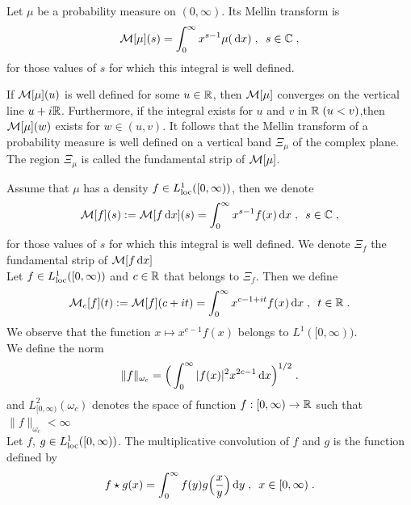 Let $\mu$ be a probability measure on $(0, \infty)$. Its Mellin transform is
    \begin{equation}
    \mathcal{M}[\mu](s) = \int_0^\infty x^{s-1} \mu(\,\mathrm{d} x)
    \; , \enspace 
    s \in \mathbb{C}
    \; ,
    \label{def:mellin}
    \end{equation}
for those values of $s$ for which this integral is well defined.\\
\begin{remark}
    If $\mathcal{M}[\mu](u)$ is well defined for some $u \in \mathbb{R}$, then $\mathcal{M}[\mu]$ converges on the vertical line $u + i\mathbb{R}$. Furthermore, if the integral exists for $u$ and $v$ in $\mathbb{R} \; ( u < v)$,then $\mathcal{M}[\mu](w)$ exists for $w \in (u,v)$. It follows that the Mellin transform of a probability measure is well defined on a vertical band $\Xi_\mu$ of the complex plane. The region $\Xi_\mu$ is called the fundamental strip of $\mathcal{M}[\mu]$. 
\end{remark}
Assume that $\mu$ has a density $f \in L_{\text{loc}}^1([0, \infty))$, then we denote
    \begin{equation*}
    \mathcal{M}[f](s):= \mathcal{M}[f\,\mathrm{d} x](s) = \int_0^\infty x^{s-1} f(x) \,\mathrm{d} x
    \; , \enspace 
    s \in \mathbb{C}
    \; ,
    \end{equation*}
for those values of $s$ for which this integral is well defined. We denote $\Xi_f$ the fundamental strip of $\mathcal{M}[f\,\mathrm{d} x]$\\

Let $f \in L_{\text{loc}}^1([0, \infty))$ and $c \in \mathbb{R}$ that belongs to $ \Xi_f$. Then we define
    \begin{equation*}
        \mathcal{M}_c[f](t):= \mathcal{M}[f](c + it) = \int_0^\infty x^{c-1+it}f(x) \,\mathrm{d} x
        \; , \enspace
        t \in \mathbb{R}
        \; .
    \end{equation*}
We observe that the function $x \mapsto x^{c-1}f(x)$ belongs to $L^1([0, \infty))$. \\

We define the norm 
\begin{equation*}
    \| f \|_{\omega_c} = \Big( \int_{0}^\infty |f(x)|^2 x^{2c-1} \,\mathrm{d} x \Big)^{1/2}
    \; .
\end{equation*}
and $ L^2_{[0, \infty)}(\omega_c)$ denotes the space of function $f: [0, \infty) \to \mathbb{R}$ such that $\| f \|_{\omega_c} < \infty$\\

Let $f$, $g \in L_{\text{loc}}^1([0, \infty))$. The multiplicative convolution of $f$ and $g$ is the function defined by 
\begin{equation*}
    f \star g (x) = \int_0^\infty f(y) g\Big(\frac{x}{y}\Big) \,\mathrm{d} y
    \; , \enspace
    x \in [0, \infty)
    \; .
\end{equation*}


